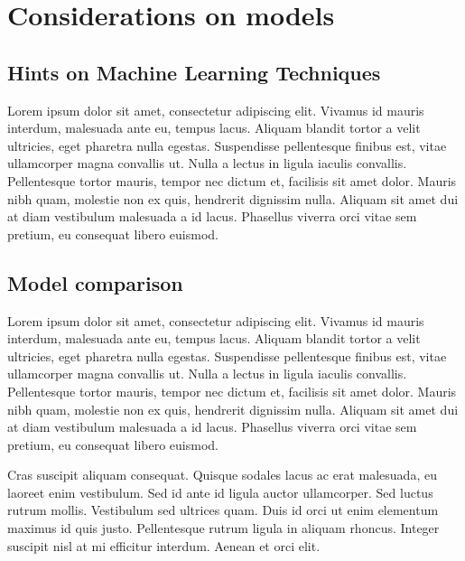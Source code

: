 \documentclass[a4paper, nobind]{templates/ociamthesis}
\theoremstyle{definition}
\theoremstyle{definition}
\theoremstyle{definition}
\theoremstyle{remark}
\begin{document}
\newpage

\hypertarget{chap:considerations-on-models}{%
\section{Considerations on models}\label{chap:considerations-on-models}}

\hypertarget{hints-on-machine-learning-techniques}{%
\subsection{Hints on Machine Learning Techniques}\label{hints-on-machine-learning-techniques}}

Lorem ipsum dolor sit amet, consectetur adipiscing elit. Vivamus id mauris interdum, malesuada ante eu, tempus lacus. Aliquam blandit tortor a velit ultricies, eget pharetra nulla egestas. Suspendisse pellentesque finibus est, vitae ullamcorper magna convallis ut. Nulla a lectus in ligula iaculis convallis. Pellentesque tortor mauris, tempor nec dictum et, facilisis sit amet dolor. Mauris nibh quam, molestie non ex quis, hendrerit dignissim nulla. Aliquam sit amet dui at diam vestibulum malesuada a id lacus. Phasellus viverra orci vitae sem pretium, eu consequat libero euismod.

\hypertarget{chap:model-comparison}{%
\subsection{Model comparison}\label{chap:model-comparison}}

Lorem ipsum dolor sit amet, consectetur adipiscing elit. Vivamus id mauris interdum, malesuada ante eu, tempus lacus. Aliquam blandit tortor a velit ultricies, eget pharetra nulla egestas. Suspendisse pellentesque finibus est, vitae ullamcorper magna convallis ut. Nulla a lectus in ligula iaculis convallis. Pellentesque tortor mauris, tempor nec dictum et, facilisis sit amet dolor. Mauris nibh quam, molestie non ex quis, hendrerit dignissim nulla. Aliquam sit amet dui at diam vestibulum malesuada a id lacus. Phasellus viverra orci vitae sem pretium, eu consequat libero euismod.

Cras suscipit aliquam consequat. Quisque sodales lacus ac erat malesuada, eu laoreet enim vestibulum. Sed id ante id ligula auctor ullamcorper. Sed luctus rutrum mollis. Vestibulum sed ultrices quam. Duis id orci ut enim elementum maximus id quis justo. Pellentesque rutrum ligula in aliquam rhoncus. Integer suscipit nisl at mi efficitur interdum. Aenean et orci elit.
\end{document}
